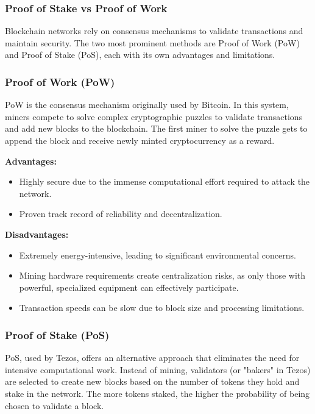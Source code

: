 \subsubsection{Proof of Stake vs Proof of Work}

Blockchain networks rely on consensus mechanisms to validate transactions and maintain security. The two most prominent methods are Proof of Work (PoW) and Proof of Stake (PoS), each with its own advantages and limitations.

\subsubsection{Proof of Work (PoW)} 

PoW is the consensus mechanism originally used by Bitcoin. In this system, miners compete to solve complex cryptographic puzzles to validate transactions and add new blocks to the blockchain. The first miner to solve the puzzle gets to append the block and receive newly minted cryptocurrency as a reward.

\textbf{Advantages:}
\begin{itemize}
    \item Highly secure due to the immense computational effort required to attack the network.
    \item Proven track record of reliability and decentralization.
\end{itemize}

\textbf{Disadvantages:}
\begin{itemize}
    \item Extremely energy-intensive, leading to significant environmental concerns.
    \item Mining hardware requirements create centralization risks, as only those with powerful, specialized equipment can effectively participate.
    \item Transaction speeds can be slow due to block size and processing limitations.
\end{itemize}

\subsubsection{Proof of Stake (PoS)}

PoS, used by Tezos, offers an alternative approach that eliminates the need for intensive computational work. Instead of mining, validators (or "bakers" in Tezos) are selected to create new blocks based on the number of tokens they hold and stake in the network. The more tokens staked, the higher the probability of being chosen to validate a block.

